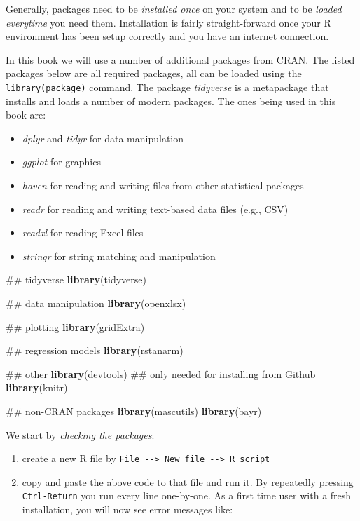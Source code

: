 \documentclass[]{svmono}
\newenvironment{Shaded}{\begin{snugshade}}{\end{snugshade}}
\newcommand{\KeywordTok}[1]{\textcolor[rgb]{0.13,0.29,0.53}{\textbf{#1}}}
\newcommand{\NormalTok}[1]{#1}
\providecommand{\tightlist}{%
  \setlength{\itemsep}{0pt}\setlength{\parskip}{0pt}}
\theoremstyle{definition}
\theoremstyle{definition}
\theoremstyle{definition}
\theoremstyle{remark}
\begin{document}
Generally, packages need to be \emph{installed once} on your system and
to be \emph{loaded everytime} you need them. Installation is fairly
straight-forward once your R environment has been setup correctly and
you have an internet connection.

In this book we will use a number of additional packages from CRAN. The
listed packages below are all required packages, all can be loaded using
the \texttt{library(package)} command. The package \emph{tidyverse} is a
metapackage that installs and loads a number of modern packages. The
ones being used in this book are:

\begin{itemize}
\tightlist
\item
  \emph{dplyr} and \emph{tidyr} for data manipulation
\item
  \emph{ggplot} for graphics
\item
  \emph{haven} for reading and writing files from other statistical
  packages
\item
  \emph{readr} for reading and writing text-based data files (e.g., CSV)
\item
  \emph{readxl} for reading Excel files
\item
  \emph{stringr} for string matching and manipulation
\end{itemize}

\begin{Shaded}
\begin{Highlighting}[]
\NormalTok{## tidyverse}
\KeywordTok{library}\NormalTok{(tidyverse)}

\NormalTok{## data manipulation}
\KeywordTok{library}\NormalTok{(openxlsx)}

\NormalTok{## plotting}
\KeywordTok{library}\NormalTok{(gridExtra)}

\NormalTok{## regression models}
\KeywordTok{library}\NormalTok{(rstanarm)}

\NormalTok{## other}
\KeywordTok{library}\NormalTok{(devtools) ## only needed for installing from Github}
\KeywordTok{library}\NormalTok{(knitr)}

\NormalTok{## non-CRAN packages}
\KeywordTok{library}\NormalTok{(mascutils)}
\KeywordTok{library}\NormalTok{(bayr)}
\end{Highlighting}
\end{Shaded}

We start by \emph{checking the packages}:

\begin{enumerate}
\def\labelenumi{\arabic{enumi}.}
\tightlist
\item
  create a new R file by
  \texttt{File\ -\/-\textgreater{}\ New\ file\ -\/-\textgreater{}\ R\ script}
\item
  copy and paste the above code to that file and run it. By repeatedly
  pressing \texttt{Ctrl-Return} you run every line one-by-one. As a
  first time user with a fresh installation, you will now see error
  messages like:
\end{enumerate}
\end{document}
